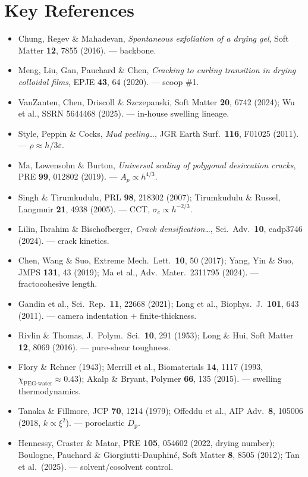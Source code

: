 \documentclass[12pt,letterpaper]{article}
\newcommand{\Dp}{D_{\mathrm{p}}}
\newcommand{\chiFH}{\chi}
\begin{document}
\section*{Key References}
\small
\begin{itemize}[leftmargin=1.2em,itemsep=0.5pt]
\item Chung, Regev \& Mahadevan, \emph{Spontaneous exfoliation of a drying gel},
Soft Matter \textbf{12}, 7855 (2016). --- backbone.
\item Meng, Liu, Gan, Pauchard \& Chen, \emph{Cracking to curling transition in
drying colloidal films}, EPJE \textbf{43}, 64 (2020). --- scoop \#1.
\item VanZanten, Chen, Driscoll \& Szczepanski, Soft Matter \textbf{20}, 6742
(2024); Wu et al., SSRN 5644468 (2025). --- in-house swelling lineage.
\item Style, Peppin \& Cocks, \emph{Mud peeling\ldots}, JGR Earth Surf.\
\textbf{116}, F01025 (2011). --- $\rho\approx h/3\bar\varepsilon$.
\item Ma, Lowensohn \& Burton, \emph{Universal scaling of polygonal desiccation
cracks}, PRE \textbf{99}, 012802 (2019). --- $A_p\propto h^{4/3}$.
\item Singh \& Tirumkudulu, PRL \textbf{98}, 218302 (2007); Tirumkudulu \&
Russel, Langmuir \textbf{21}, 4938 (2005). --- CCT, $\sigma_c\propto h^{-2/3}$.
\item Lilin, Ibrahim \& Bischofberger, \emph{Crack densification\ldots}, Sci.\
Adv.\ \textbf{10}, eadp3746 (2024). --- crack kinetics.
\item Chen, Wang \& Suo, Extreme Mech.\ Lett.\ \textbf{10}, 50 (2017); Yang, Yin
\& Suo, JMPS \textbf{131}, 43 (2019); Ma et al., Adv.\ Mater.\ 2311795 (2024). ---
fractocohesive length.
\item Gandin et al., Sci.\ Rep.\ \textbf{11}, 22668 (2021); Long et al., Biophys.\
J.\ \textbf{101}, 643 (2011). --- camera indentation $+$ finite-thickness.
\item Rivlin \& Thomas, J.\ Polym.\ Sci.\ \textbf{10}, 291 (1953); Long \& Hui,
Soft Matter \textbf{12}, 8069 (2016). --- pure-shear toughness.
\item Flory \& Rehner (1943); Merrill et al., Biomaterials \textbf{14}, 1117
(1993, $\chiFH_{\text{PEG-water}}\!\approx\!0.43$); Akalp \& Bryant, Polymer
\textbf{66}, 135 (2015). --- swelling thermodynamics.
\item Tanaka \& Fillmore, JCP \textbf{70}, 1214 (1979); Offeddu et al., AIP Adv.\
\textbf{8}, 105006 (2018, $k\propto\xi^2$). --- poroelastic $\Dp$.
\item Hennessy, Craster \& Matar, PRE \textbf{105}, 054602 (2022, drying number);
Boulogne, Pauchard \& Giorgiutti-Dauphin\'e, Soft Matter \textbf{8}, 8505 (2012);
Tan et al.\ (2025). --- solvent/cosolvent control.
\end{itemize}
\end{document}
